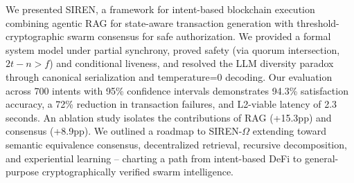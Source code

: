 \documentclass[11pt]{article}
\begin{document}
We presented SIREN, a framework for intent-based blockchain execution combining agentic RAG for state-aware transaction generation with threshold-cryptographic swarm consensus for safe authorization. We provided a formal system model under partial synchrony, proved safety (via quorum intersection, $2t - n > f$) and conditional liveness, and resolved the LLM diversity paradox through canonical serialization and temperature=0 decoding. Our evaluation across 700 intents with 95\% confidence intervals demonstrates 94.3\% satisfaction accuracy, a 72\% reduction in transaction failures, and L2-viable latency of 2.3 seconds. An ablation study isolates the contributions of RAG (+15.3pp) and consensus (+8.9pp). We outlined a roadmap to SIREN-$\Omega$ extending toward semantic equivalence consensus, decentralized retrieval, recursive decomposition, and experiential learning -- charting a path from intent-based DeFi to general-purpose cryptographically verified swarm intelligence.
\end{document}
